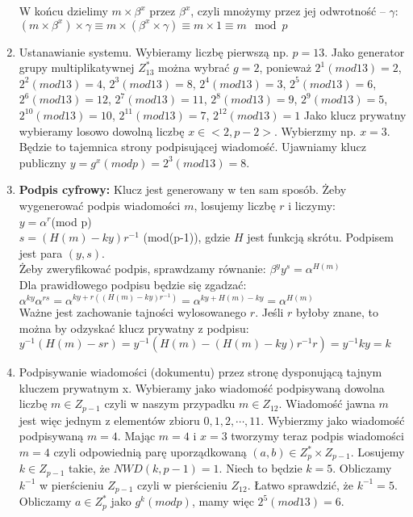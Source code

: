 \documentclass[a4paper,10pt, twocolumn]{article}
\begin{document}
\begin{enumerate}
  W końcu dzielimy $m \times \beta^x$ przez $\beta^x$, czyli mnożymy przez jej odwrotność – $\gamma$:
  \\$(m \times \beta^x) \times \gamma \equiv m \times (\beta^x \times \gamma) \equiv m \times 1 \equiv m \mod p$
 \item Ustanawianie systemu. Wybieramy liczbę pierwszą np. $p=13$. Jako generator grupy multiplikatywnej $Z^*_{13}$ można wybrać $g=2$, ponieważ $2^1(mod13)=2$, $2^2(mod13)=4$,  $2^3(mod13)=8$, $2^4(mod13)=3$, $2^5(mod13)=6$, $2^6(mod13)=12$, $2^7(mod13)=11$, $2^8(mod13)=9$, $2^9(mod13)=5$, $2^{10}(mod13)=10$, $2^{11}(mod13)=7$, $2^{12}(mod13)=1$
 Jako klucz prywatny wybieramy losowo dowolną liczbę $x \in <2,p-2>$. Wybierzmy np. $x=3$. Będzie to tajemnica strony podpisującej wiadomość. Ujawniamy klucz publiczny $y=g^x(modp)=2^3(mod13)=8$.
 \item \textbf{Podpis cyfrowy:}
  Klucz jest generowany w ten sam sposób. Żeby wygenerować podpis wiadomości $m$, losujemy liczbę $r$ i liczymy:
  \\$y = \alpha^r$(mod p)
  \\$s = (H(m)-ky)r^{-1}$ (mod(p-1)), gdzie $H$ jest funkcją skrótu.
  Podpisem jest para $(y,s)$.
  \\Żeby zweryfikować podpis, sprawdzamy równanie:
  $\beta^y y^s = \alpha^{H(m)}$
  \\Dla prawidłowego podpisu będzie się zgadzać:
  \\$\alpha^{ky} \alpha^{rs} = \alpha^{ky + r\left((H(m)-ky)r^{-1}\right)} = \alpha^{ky + H(m)- ky} = \alpha^{H(m)}$
  \\Ważne jest zachowanie tajności wylosowanego $r$. Jeśli $r$ byłoby znane, to można by odzyskać klucz prywatny z podpisu:
  \\$y^{-1}\left(H(m)-sr\right) = y^{-1}\left(H(m)-(H(m)-ky)r^{-1}r\right)=y^{-1}ky=k$
 \item Podpisywanie wiadomości (dokumentu) przez stronę dysponującą tajnym kluczem prywatnym x.
 Wybieramy jako wiadomość podpisywaną dowolna liczbę $m \in Z_{p-1}$ czyli w naszym przypadku $m \in Z_{12}$. Wiadomość jawna $m$ jest więc jednym z elementów zbioru ${0,1,2,\cdots,11}$. Wybierzmy jako wiadomość podpisywaną $m=4$. Mając $m=4$ i $x=3$ tworzymy teraz podpis wiadomości $m=4$ czyli odpowiednią parę uporządkowaną $(a, b) \in Z^*_p \times Z_{p-1}$.
 Losujemy $k \in Z_{p-1}$ takie, że $NWD(k,p-1)=1$. Niech to będzie $k=5$. Obliczamy $k^{-1}$ w pierścieniu $Z_{p-1}$ czyli w pierścieniu $Z_{12}$. Łatwo sprawdzić, że  $k^{-1}=5$. Obliczamy $a \in Z^*_p$ jako $g^k(modp)$, mamy więc $2^5(mod13)=6$.

\end{enumerate}
\end{document}
